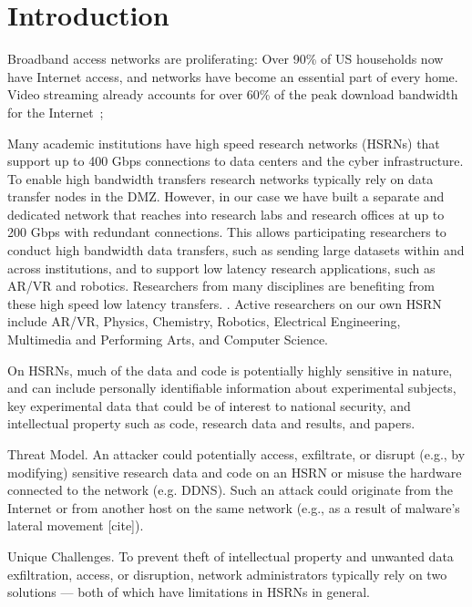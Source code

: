 \begin{center}
{\large \bf \TITLE}
\end{center}

\section{Introduction}

Broadband access networks are proliferating: Over 90\% of US households
now have Internet access, and networks have become an essential part of
every home.  Video streaming already accounts for over 60\% of the peak
download bandwidth for the Internet~\cite{www-bismark};

Many academic institutions have high speed research networks (HSRNs) that support up to 400 Gbps connections to data centers and the cyber infrastructure. To enable high bandwidth transfers research networks typically rely on data transfer nodes in the DMZ. However, in our case we have built a separate and dedicated network that reaches into research labs and research offices at up to 200 Gbps with redundant connections. This allows participating researchers to conduct high bandwidth data transfers, such as sending large datasets within and across institutions, and to support  low latency research applications, such as AR/VR and robotics. Researchers from many disciplines are benefiting from these high speed low latency transfers. . Active researchers on our own HSRN include AR/VR, Physics, Chemistry, Robotics, Electrical Engineering, Multimedia and Performing Arts, and Computer Science.

On HSRNs, much of the data and code is potentially highly sensitive in nature, and can include personally identifiable information about experimental subjects, key experimental data that could be of interest to national security, and intellectual property such as code, research data and results, and papers.

Threat Model. An attacker could potentially access, exfiltrate, or disrupt (e.g., by modifying) sensitive research data and code on an HSRN or misuse the hardware connected to the network (e.g. DDNS). Such an  attack could originate from the Internet or from another host on the same network (e.g., as a result of malware's lateral movement [cite]).

Unique Challenges. To prevent theft of intellectual property and unwanted data exfiltration, access, or disruption, network administrators typically rely on two solutions — both of which have limitations in HSRNs in general.

